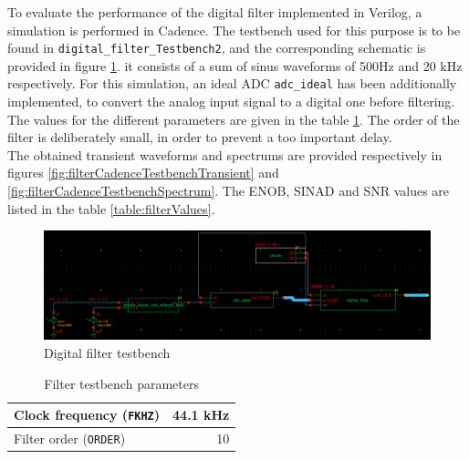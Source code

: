 To evaluate the performance of the digital filter implemented in Verilog, a simulation is performed in Cadence. The testbench used for this purpose is to be found in \texttt{digital\_filter\_Testbench2}, and the corresponding schematic is provided in figure \ref{fig:filterTestbench}. it consists of a sum of sinus waveforms of 500Hz and 20 kHz respectively. For this simulation, an ideal ADC \texttt{adc\_ideal} has been additionally implemented, to convert the analog input signal to a digital one before filtering. The values for the different parameters are given in the table \ref{table:filterTestbench}. The order of the filter is deliberately small, in order to prevent a too important delay.\\
The obtained transient waveforms and spectrums are provided respectively in figures \ref{fig:filterCadenceTestbenchTransient} and \ref{fig:filterCadenceTestbenchSpectrum}. The ENOB, SINAD and SNR values are listed in the table \ref{table:filterValues}.
 

\begin{figure}[!h]
	\centering 
	\includegraphics[scale=0.55]{images/Filter/testbench.png}
	\caption{Digital filter testbench}
	\label{fig:filterTestbench}
\end{figure} 

\begin{table}[!h]
	\centering
	\begin{tabular}{|l|r|}
		\hline
		Clock frequency (\texttt{FKHZ}) & 44.1 kHz \\
		\hline
		Filter order (\texttt{ORDER}) & 10 \\
		\hline
	\end{tabular}
	\caption{Filter testbench parameters}
	\label{table:filterTestbench}
\end{table}

